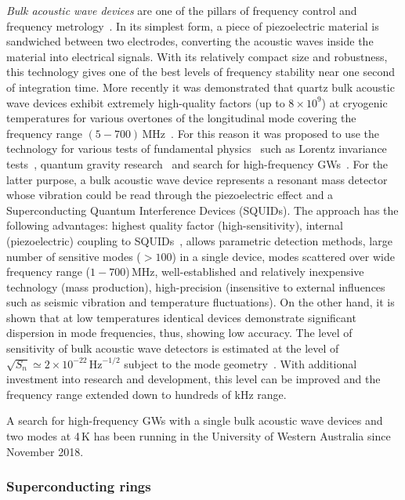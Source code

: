 \documentclass[11pt,a4paper]{article}
\begin{document}
\textit{Bulk acoustic wave devices} are one of the pillars of frequency control and frequency metrology~\cite{ScRep}. In its simplest form, a piece of piezoelectric material is sandwiched between two electrodes, converting the acoustic waves inside the material into electrical signals. With its relatively compact size and robustness, this technology gives one of the best levels of frequency stability near one second of integration time. More recently it was demonstrated that quartz bulk acoustic wave devices exhibit extremely high-quality factors (up to $8 \times 10^9$) at cryogenic temperatures for various overtones of the longitudinal mode covering the frequency range $(5 - 700)\,$MHz~\cite{ScRep,quartzPRL}. For this reason it was proposed to use the technology for various tests of fundamental physics~\cite{ScRep} such as Lorentz invariance tests~\cite{PhysRevX.6.011018}, quantum gravity research~\cite{PhysRevD.100.066020} and search for high-frequency GWs~\cite{Goryachev:2014ac}. For the latter purpose, a bulk acoustic wave device represents a resonant mass detector whose vibration could be read through the piezoelectric effect and a Superconducting Quantum Interference Devices (SQUIDs). The approach has the following advantages: highest quality factor (high-sensitivity), internal (piezoelectric) coupling to SQUIDs~\cite{Goryachev:2014ab}, allows parametric detection methods, large number of sensitive modes ($>100$) in a single device, modes scattered over wide frequency range ($1-700$)\,MHz, well-established and relatively inexpensive technology (mass production), high-precision (insensitive to external influences such as seismic vibration and temperature fluctuations). On the other hand, it is shown that at low temperatures identical devices demonstrate significant dispersion in mode frequencies, thus, showing low accuracy. The level of sensitivity of bulk acoustic wave detectors is estimated at the level of $\sqrt{S_n} \simeq 2\times 10^{-22}\, \text{Hz}^{-1/2}$ subject to the mode geometry~\cite{Goryachev:2014ac}. With additional investment into research and development, this level can be improved and the frequency range extended down to hundreds of kHz range.

A search for high-frequency GWs with a single bulk acoustic wave devices and two modes at 4\,K has been running in the University of Western Australia since November 2018.

\subsubsection{Superconducting rings}
\label{sec:SuperconductingRings}
\end{document}
